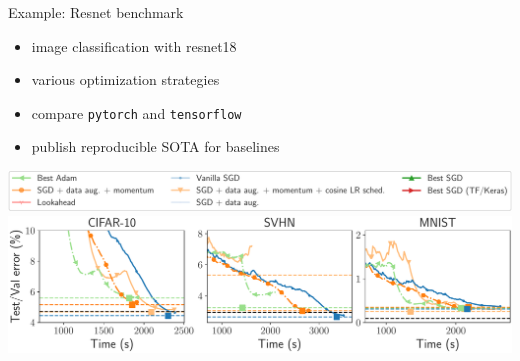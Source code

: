 \documentclass[unknownkeysallowed]{beamer}
\begin{document}
\begin{frame}{Example: Resnet benchmark}

    { \small
    \begin{itemize}
        \item image classification with resnet18
        \item various optimization strategies
        \item compare \texttt{pytorch} and \texttt{tensorflow}
        \item publish reproducible SOTA for baselines
    \end{itemize}
    }

    \centering
    \includegraphics[width=\linewidth]{../sharedimages/resnet18_sgd_torch_legend.pdf}
    \includegraphics[width=\linewidth]{../sharedimages/resnet18_sgd_torch_val.pdf}
\end{frame}










\end{document}
